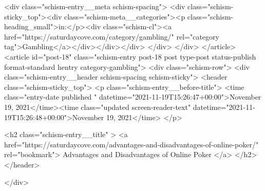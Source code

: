 {		<div class="schism-entry__meta schism-spacing">			<div class="schism-sticky_top"><div class="schism-meta__categories"><p class="schism-heading_small">in:</p><div class="schism-cl"><a href="https://saturdaycove.com/category/gambling/" rel="category tag">Gambling</a></div></div></div>		</div>
	</div>
</article>
<article id="post-18" class="schism-entry post-18 post type-post status-publish format-standard hentry category-gambling">
	<div class="schism-row">		<div class="schism-entry__header schism-spacing schism-sticky">			<header class="schism-sticky_top">				<p class="schism-entry__before-title">
					<time class="entry-date published " datetime="2021-11-19T15:26:47+00:00">November 19, 2021</time><time class="updated screen-reader-text" datetime="2021-11-19T15:26:48+00:00">November 19, 2021</time>				</p>

				<h2 class="schism-entry__title" >
					<a href="https://saturdaycove.com/advantages-and-disadvantages-of-online-poker/" rel="bookmark">
						Advantages and Disadvantages of Online Poker					</a>
				</h2>
			</header>

					</div>

}

